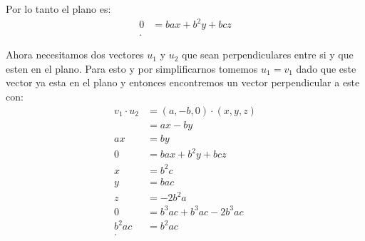 \begin{enumerate}
\begin{enumerate}
	    Por lo tanto el plano es:
	    \begin{align*}
	      0 &= ba x + b^2 y + bc z \\
	    .\end{align*}

	    Ahora necesitamos dos vectores $u_1$ y $u_2$ que sean perpendiculares entre si y que esten en el plano. Para esto y por simplificarnos tomemos $u_1=v_1$ dado que este vector ya esta en el plano y entonces encontremos un vector perpendicular a este con:
	    \begin{align*}
	      v_1\cdot u_2 &= \left( a,-b,0 \right) \cdot \left( x,y,z \right)  \\
	      &= ax - by \\
	      ax &= by \\
	      0 &= ba x + b^2 y + bc z \\
	      x &= b^2 c \\
	      y &= bac \\
	      z &= -2b^2a \\
	      0 &= b^{3}ac + b^{3}ac - 2b^{3}ac \\
	      b^2ac &= b^2ac \\
	    .\end{align*}


\end{enumerate}
\end{enumerate}
